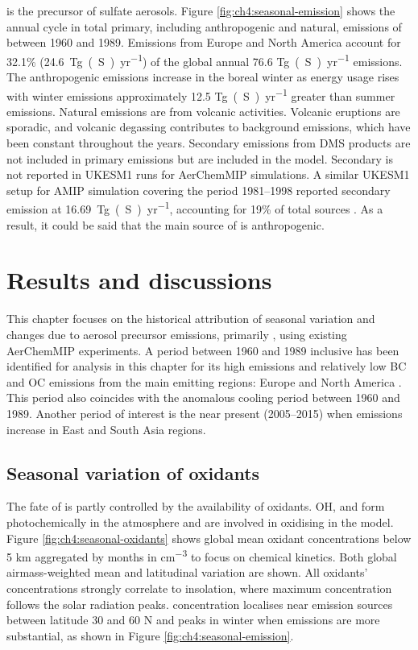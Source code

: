  is the precursor of sulfate aerosols. Figure \ref{fig:ch4:seasonal-emission} shows the annual cycle in total primary, including anthropogenic and natural, emissions of  between 1960 and 1989. Emissions from Europe and North America account for 32.1\% (\qty{24.6}{Tg(S)~yr^{-1}}) of the global annual 76.6 \unit{Tg(S)~yr^{-1}} emissions. The anthropogenic emissions increase in the boreal winter as energy usage rises with winter emissions approximately 12.5 \unit{Tg(S)~yr^{-1}} greater than summer emissions. Natural emissions are from volcanic activities. Volcanic eruptions are sporadic, and volcanic degassing contributes to background emissions, which have been constant throughout the years. Secondary  emissions from DMS products are not included in primary emissions but are included in the model. Secondary  is not reported in UKESM1 runs for AerChemMIP simulations. A similar UKESM1 setup for AMIP simulation covering the period 1981--1998 reported secondary  emission at \qty{16.69}{Tg(S)~yr^{-1}}, accounting for 19\% of total  sources \citep{mulcahyDescriptionEvaluationAerosol2020}. As a result, it could be said that the main source of  is anthropogenic.

\section{Results and discussions}

This chapter focuses on the historical attribution of seasonal variation and changes due to aerosol precursor emissions, primarily , using existing AerChemMIP experiments. A period between 1960 and 1989 inclusive has been identified for analysis in this chapter for its high  emissions and relatively low BC and OC emissions from the main emitting regions: Europe and North America \citep{hoeslyHistorical175020142018}. This period also coincides with the anomalous cooling period between 1960 and 1989. Another period of interest is the near present (2005--2015) when  emissions increase in East and South Asia regions. 


\subsection{Seasonal variation of oxidants}

The fate of  is partly controlled by the availability of oxidants. OH,  and  form photochemically in the atmosphere and are involved in oxidising  in the model. Figure \ref{fig:ch4:seasonal-oxidants} shows global mean oxidant concentrations below 5 km aggregated by months in \unit{cm^{-3}} to focus on chemical kinetics. Both global airmass-weighted mean and latitudinal variation are shown. All oxidants' concentrations strongly correlate to insolation, where maximum concentration follows the solar radiation peaks.  concentration localises near emission sources between latitude 30 and 60 \textdegree N and peaks in winter when emissions are more substantial, as shown in Figure \ref{fig:ch4:seasonal-emission}.

